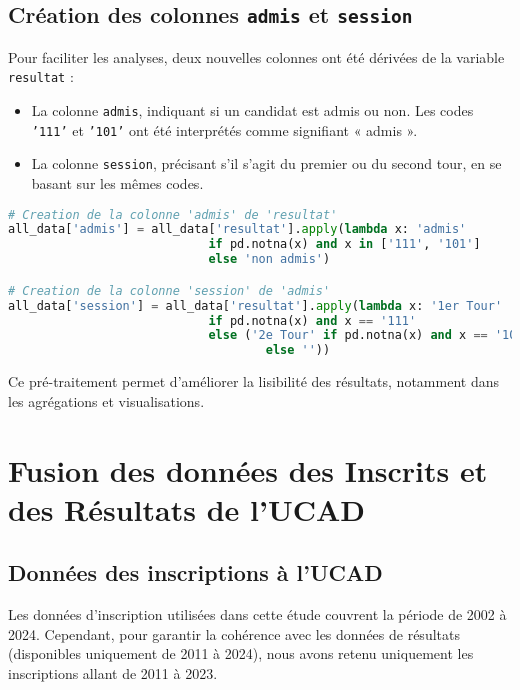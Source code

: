 \newpage
\subsection{Création des colonnes \texttt{admis} et \texttt{session}}

Pour faciliter les analyses, deux nouvelles colonnes ont été dérivées de la variable \texttt{resultat} :
\begin{itemize}
\item La colonne \texttt{admis}, indiquant si un candidat est admis ou non. Les codes \texttt{'111'} et \texttt{'101'} ont été interprétés comme signifiant « admis ».
\item La colonne \texttt{session}, précisant s’il s’agit du premier ou du second tour, en se basant sur les mêmes codes.
\end{itemize}

\begin{lstlisting}[language=Python,
    caption=Création de nouvelles colonnes,
    label=lst:creation_colonnes,
    basicstyle=\ttfamily\small,
    backgroundcolor=\color{gray!10}
]
# Creation de la colonne 'admis' de 'resultat'
all_data['admis'] = all_data['resultat'].apply(lambda x: 'admis' 
                            if pd.notna(x) and x in ['111', '101'] 
                            else 'non admis')

# Creation de la colonne 'session' de 'admis'
all_data['session'] = all_data['resultat'].apply(lambda x: '1er Tour' 
                            if pd.notna(x) and x == '111' 
                            else ('2e Tour' if pd.notna(x) and x == '101' 
                                    else ''))
\end{lstlisting}

Ce pré-traitement permet d’améliorer la lisibilité des résultats, notamment dans les agrégations et visualisations.

\newpage
\section{Fusion des données des Inscrits et des Résultats de l’UCAD}

\subsection{Données des inscriptions à l’UCAD}

Les données d’inscription utilisées dans cette étude couvrent la période de 2002 à 2024. 
Cependant, pour garantir la cohérence avec les données de résultats (disponibles uniquement de 2011 à 2024), 
nous avons retenu uniquement les inscriptions allant de 2011 à 2023.

